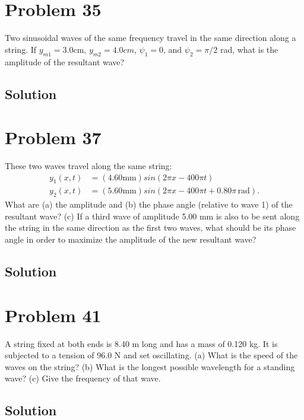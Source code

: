 \documentclass[12pt]{article}
\begin{document}
    \pagebreak
    \section{Problem 35}
        Two sinusoidal waves of the same frequency travel in the same direction along a string. 
        If $y_{m1} = 3.0 \unit{\centi\meter}$, $y_{m2} = 4.0 cm$, $\psi_1 = 0$, and $\psi_2 = \pi/2$ rad, what is the amplitude of the resultant wave?

        \subsection{Solution}

    \section{Problem 37}
        These two waves travel along the same string:
        \begin{align}
            y_1(x, t)   &=  (4.60 \unit{\milli\meter}) sin(2\pi x - 400\pi t)\\
            y_2(x, t)   &=  (5.60 \unit{\milli\meter}) sin(2\pi x - 400\pi t + 0.80\pi\,\unit{\radian}).
        \end{align}
        What are (a) the amplitude and (b) the phase angle (relative to wave 1) of the resultant wave? 
        (c) If a third wave of amplitude 5.00 mm is also to be sent along the string in the same direction as the first two waves, what should be its phase angle in order to maximize the amplitude of the new resultant wave?

        \subsection{Solution}

    \section{Problem 41}
        A string fixed at both ends is 8.40 m long and has a mass of 0.120 kg. 
        It is subjected to a tension of 96.0 N and set oscillating. 
        (a) What is the speed of the waves on the string? 
        (b) What is the longest possible wavelength for a standing wave? 
        (c) Give the frequency of that wave.

        \subsection{Solution}
\end{document}
